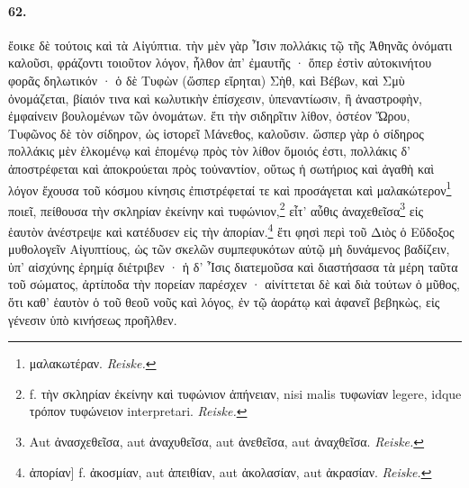 \documentclass[a4paper, 11pt, oneside, polutonikogreek, german]{article}
\begin{document}
\paragraph{62.}
ἔοικε δὲ τούτοις καὶ τὰ Αἰγύπτια. τὴν μὲν γὰρ Ἶσιν πολλάκις τῷ τῆς Ἀθηνᾶς ὀνόματι καλοῦσι, φράζοντι τοιοῦτον λόγον, ἦλθον ἀπ' ἐμαυτῆς · ὅπερ ἐστὶν αὐτοκινήτου φορᾶς δηλωτικόν · ὁ δὲ Τυφὼν (ὥσπερ εἴρηται) Σὴθ, καὶ Βέβων, καὶ Σμὺ ὀνομάζεται, βίαιόν τινα καὶ κωλυτικὴν ἐπίσχεσιν, ὑπεναντίωσιν, ἢ ἀναστροφὴν, ἐμφαίνειν βουλομένων τῶν ὀνομάτων. ἔτι τὴν σιδηρῖτιν λίθον, ὀστέον Ὥρου, Τυφῶνος δὲ τὸν σίδηρον, ὡς ἱστορεῖ Μάνεθος, καλοῦσιν. ὥσπερ γὰρ ὁ σίδηρος πολλάκις μὲν ἑλκομένῳ καὶ ἑπομένῳ πρὸς τὸν λίθον ὅμοιός ἐστι, πολλάκις δ' ἀποστρέφεται καὶ ἀποκρούεται πρὸς τοὐναντίον, οὕτως ἡ σωτήριος καὶ ἀγαθὴ καὶ λόγον ἔχουσα τοῦ κόσμου κίνησις ἐπιστρέφεταί τε καὶ προσάγεται καὶ μαλακώτερον\footnote{μαλακωτέραν. \emph{Reiske.}} ποιεῖ, πείθουσα τὴν σκληρίαν ἐκείνην καὶ τυφώνιον,\footnote{f. τὴν σκληρίαν ἐκείνην καὶ τυφώνιον ἀπήνειαν, nisi malis τυφωνίαν legere, idque τρόπον τυφώνειον interpretari. \emph{Reiske.}} εἶτ' αὖθις ἀναχεθεῖσα\footnote{Aut ἀνασχεθεῖσα, aut ἀναχυθεῖσα, aut ἀνεθεῖσα, aut ἀναχθεῖσα. \emph{Reiske.}} εἰς ἑαυτὸν ἀνέστρεψε καὶ κατέδυσεν εἰς τὴν ἀπορίαν.\footnote{ἀπορίαν] f. ἀκοσμίαν, aut ἀπειθίαν, aut ἀκολασίαν, aut ἀκρασίαν. \emph{Reiske.}} ἔτι φησὶ περὶ τοῦ Διὸς ὁ Εὔδοξος μυθολογεῖν Αἰγυπτίους, ὡς τῶν σκελῶν συμπεφυκότων αὐτῷ μὴ δυνάμενος βαδίζειν, ὑπ' αἰσχύνης ἐρημίᾳ διέτριβεν · ἡ δ' Ἶσις διατεμοῦσα καὶ διαστήσασα τὰ μέρη ταῦτα τοῦ σώματος, ἀρτίποδα τὴν πορείαν παρέσχεν · αἰνίττεται δὲ καὶ διὰ τούτων ὁ μῦθος, ὅτι καθ' ἑαυτὸν ὁ τοῦ θεοῦ νοῦς καὶ λόγος, ἐν τῷ ἀοράτῳ καὶ ἀφανεῖ βεβηκὼς, εἰς γένεσιν ὑπὸ κινήσεως προῆλθεν.
\end{document}
